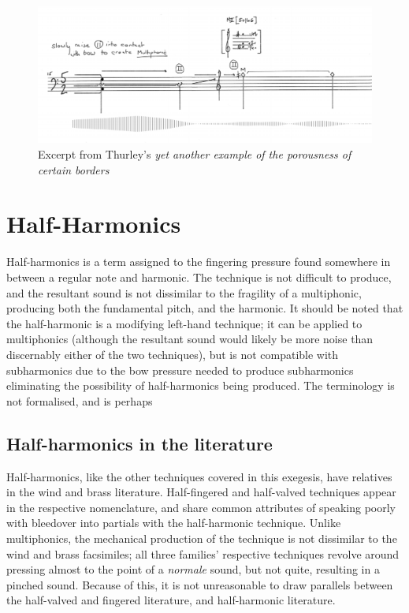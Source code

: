   \begin{figure}
    \includegraphics[width=\linewidth]{./resources/thurleyMultiphonicNotation.png}
    \caption{Excerpt from Thurley's \emph{yet another example of the porousness of certain borders}\autocite[]{thurleyAnotherExamplePorousness2014}}
\label{fig:Excerpt from Thurley's `yet another example of the porousness of certain borders'}
  \end{figure}

\newpage
\section{Half-Harmonics}
Half-harmonics is a term assigned to the fingering pressure found somewhere in between a regular note and harmonic. 
The technique is not difficult to produce, and the resultant sound is not dissimilar to the fragility of a multiphonic, producing both the fundamental pitch, and the harmonic. 
It should be noted that the half-harmonic is a modifying left-hand technique; it can be applied to multiphonics (although the resultant sound would likely be more noise than discernably either of the two techniques), but is not compatible with subharmonics due to the bow pressure needed to produce subharmonics eliminating the possibility of half-harmonics being produced.
The terminology is not formalised, and is perhaps 

\subsection{Half-harmonics in the literature}
Half-harmonics, like the other techniques covered in this exegesis, have relatives in the wind and brass literature. 
Half-fingered and half-valved techniques appear in the respective nomenclature, and share common attributes of speaking poorly with bleedover into partials with the half-harmonic technique.
Unlike multiphonics, the mechanical production of the technique is not dissimilar to the wind and brass facsimiles; all three families' respective techniques revolve around pressing almost to the point of a \emph{normale} sound, but not quite, resulting in a pinched sound.
Because of this, it is not unreasonable to draw parallels between the half-valved and fingered literature, and half-harmonic literature. 

